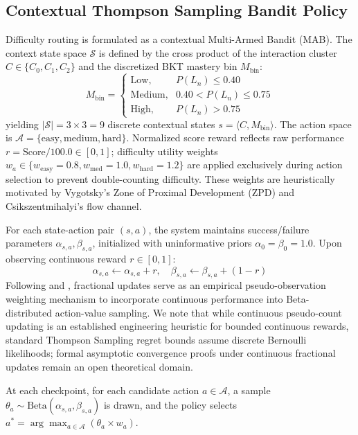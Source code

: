 \documentclass[notitlepage,12pt]{jedm}
\begin{document}
\subsection{Contextual Thompson Sampling Bandit Policy}
Difficulty routing is formulated as a contextual Multi-Armed Bandit (MAB). The context state space $\mathcal{S}$ is defined by the cross product of the interaction cluster $C \in \{C_0, C_1, C_2\}$ and the discretized BKT mastery bin $M_{\text{bin}}$:
\begin{equation}
M_{\text{bin}} = \begin{cases}
\text{Low}, & P(L_n) \le 0.40 \\
\text{Medium}, & 0.40 < P(L_n) \le 0.75 \\
\text{High}, & P(L_n) > 0.75
\end{cases}
\end{equation}
yielding $|\mathcal{S}| = 3 \times 3 = 9$ discrete contextual states $s = \langle C, M_{\text{bin}} \rangle$. The action space is $\mathcal{A} = \{\text{easy}, \text{medium}, \text{hard}\}$. Normalized score reward reflects raw performance $r = \text{Score}/100.0 \in [0,1]$; difficulty utility weights $w_a \in \{w_{\text{easy}}=0.8, w_{\text{med}}=1.0, w_{\text{hard}}=1.2\}$ are applied exclusively during action selection to prevent double-counting difficulty. These weights are heuristically motivated by Vygotsky's Zone of Proximal Development (ZPD) and Csikszentmihalyi's flow channel.

For each state-action pair $(s,a)$, the system maintains success/failure parameters $\alpha_{s,a}, \beta_{s,a}$, initialized with uninformative priors $\alpha_0=\beta_0=1.0$. Upon observing continuous reward $r \in [0,1]$:
\begin{equation}
\alpha_{s,a} \leftarrow \alpha_{s,a} + r, \quad \beta_{s,a} \leftarrow \beta_{s,a} + (1 - r)
\label{eq_bandit_update}
\end{equation}
Following \cite{chapelle2011empirical} and \cite{agrawal2012analysis}, fractional updates serve as an empirical pseudo-observation weighting mechanism to incorporate continuous performance into Beta-distributed action-value sampling. We note that while continuous pseudo-count updating is an established engineering heuristic for bounded continuous rewards, standard Thompson Sampling regret bounds assume discrete Bernoulli likelihoods; formal asymptotic convergence proofs under continuous fractional updates remain an open theoretical domain.

At each checkpoint, for each candidate action $a \in \mathcal{A}$, a sample $\theta_a \sim \text{Beta}(\alpha_{s,a}, \beta_{s,a})$ is drawn, and the policy selects $a^* = \arg\max_{a \in \mathcal{A}}(\theta_a \times w_a)$.
\end{document}
